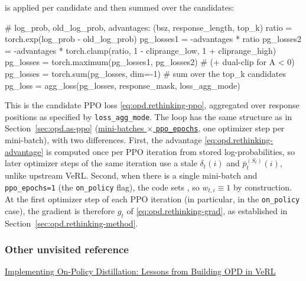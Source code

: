 \begin{enumerate}
    is applied per candidate and then summed over the candidates:
    \begin{codeblock}[language=Python]
# log_prob, old_log_prob, advantages: (bsz, response_length, top_k)
ratio = torch.exp(log_prob - old_log_prob)
pg_losses1 = -advantages * ratio
pg_losses2 = -advantages * torch.clamp(ratio, 1 - cliprange_low, 1 + cliprange_high)
pg_losses = torch.maximum(pg_losses1, pg_losses2)   # (+ dual-clip for A < 0)
pg_losses = torch.sum(pg_losses, dim=-1)            # sum over the top_k candidates
pg_loss = agg_loss(pg_losses, response_mask, loss_agg_mode)
    \end{codeblock}
    This is the candidate PPO loss \eqref{eq:opd.rethinking-ppo}, aggregated over response
    positions as specified by \texttt{loss\_agg\_mode}. The loop has the same structure as in
    Section~\ref{sec:opd.as-ppo}
    (\href{https://github.com/Thinking-Space/Rethinking-OPD/blob/ac26e38d6f1572eb027597b48a9f4e01f6915ef8/verl/verl/workers/actor/dp_actor.py#L787-L793}{mini-batches $\times$ \texttt{ppo\_epochs}},
    one optimizer step per mini-batch), with two differences. First, the advantage
    \eqref{eq:opd.rethinking-advantage} is computed once per PPO iteration from stored
    log-probabilities, so later optimizer steps of the same iteration use a stale
    $\delta_t(i)$ and $\bar p_t^{(S_t)}(i)$, unlike upstream VeRL. Second, when there is a
    single mini-batch and \texttt{ppo\_epochs=1} (the \texttt{on\_policy} flag), the code
    sets , so $w_{t,i}\equiv 1$ by
    construction. At the first optimizer step of each PPO iteration (in particular, in the
    \texttt{on\_policy} case), the gradient is therefore $g_t$ of
    \eqref{eq:opd.rethinking-grad}, as established in Section~\ref{sec:opd.rethinking-method}.

\end{enumerate}

\subsubsection{Other unvisited reference}
\href{https://zoeyli.com/reinforcement%20learning/implementing-on-policy-distillation/}{Implementing On-Policy Distillation: Lessons from Building OPD in VeRL}





